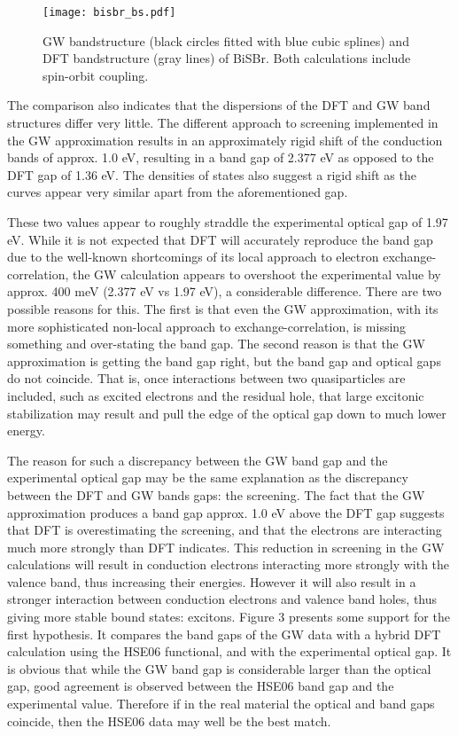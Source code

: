 \documentclass[prb,showpacs,superscriptaddress,titlepage,amsmath,amssymb,twocolumn]{revtex4-1}
\begin{document}
\begin{figure*}[!t]
    \centering
    \texttt{[image: bisbr\_bs.pdf]}
    \caption{GW bandstructure (black circles fitted with blue cubic splines) and DFT bandstructure (gray lines) of BiSBr. Both calculations include spin-orbit coupling.}
    \label{fig:bs}
\end{figure*}

The comparison also indicates that the dispersions of the DFT and GW band structures differ very little. The different approach to screening implemented in the GW approximation results in an approximately rigid shift of the conduction bands of approx. 1.0 eV, resulting in a band gap of 2.377 eV as opposed to the DFT gap of 1.36 eV. The densities of states also suggest a rigid shift as the curves appear very similar apart from the aforementioned gap.

These two values appear to roughly straddle the experimental optical gap of 1.97 eV. While it is not expected that DFT will accurately reproduce the band gap due to the well-known shortcomings of its local approach to electron exchange-correlation, the GW calculation appears to overshoot the experimental value by approx. 400 meV (2.377 eV vs 1.97 eV), a considerable difference. There are two possible reasons for this. The first is that even the GW approximation, with its more sophisticated non-local approach to exchange-correlation, is missing something and over-stating the band gap. The second reason is that the GW approximation is getting the band gap right, but the band gap and optical gaps do not coincide. That is, once interactions between two quasiparticles are included, such as excited electrons and the residual hole, that large excitonic stabilization may result and pull the edge of the optical gap down to much lower energy.

The reason for such a discrepancy between the GW band gap and the experimental optical gap may be the same explanation as the discrepancy between the DFT and GW bands gaps: the screening. The fact that the GW approximation produces a band gap approx. 1.0 eV above the DFT gap suggests that DFT is overestimating the screening, and that the electrons are interacting much more strongly than DFT indicates. This reduction in screening in the GW calculations will result in conduction electrons interacting more strongly with the valence band, thus increasing their energies. However it will also result in a stronger interaction between conduction electrons and valence band holes, thus giving more stable bound states: excitons. Figure 3 presents some support for the first hypothesis. It compares the band gaps of the GW data with a hybrid DFT calculation using the HSE06 functional, and with the experimental optical gap. It is obvious that while the GW band gap is considerable larger than the optical gap, good agreement is observed between the HSE06 band gap and the experimental value. Therefore if in the real material the optical and band gaps coincide, then the HSE06 data may well be the best match.
\end{document}
